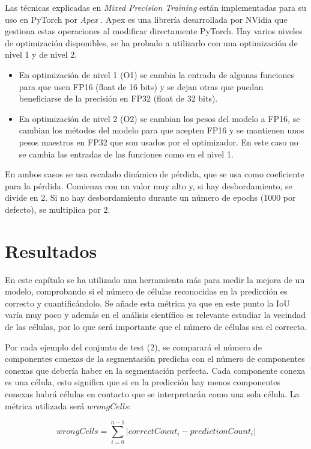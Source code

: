 Las técnicas explicadas en \textit{Mixed Precision Training} están implementadas para su uso en PyTorch por \textit{Apex} \cite{Apex2020}. Apex es una librería desarrollada por NVidia que gestiona estas operaciones al modificar directamente PyTorch. Hay varios niveles de optimización disponibles, se ha probado a utilizarlo con una optimización de nivel 1 y de nivel 2.
\begin{itemize}
\item En optimización de nivel 1 (O1) se cambia la entrada de algunas funciones para que usen FP16 (float de 16 bits) y se dejan otras que puedan beneficiarse de la precisión en FP32 (float de 32 bits).
\item En optimización de nivel 2 (O2) se cambian los pesos del modelo a FP16, se cambian los métodos del modelo para que acepten FP16 y se mantienen unos pesos maestros en FP32 que son usados por el optimizador. En este caso no se cambia las entradas de las funciones como en el nivel 1.
\end{itemize}

En ambos casos se usa escalado dinámico de pérdida, que se usa como coeficiente para la pérdida. Comienza con un valor muy alto y, si hay desbordamiento, se divide en 2. Si no hay desbordamiento durante un número de epochs (1000 por defecto), se multiplica por 2.

\section{Resultados}\label{sec:apex_resultados}

En este capítulo se ha utilizado una herramienta más para medir la mejora de un modelo, comprobando si el número de células reconocidas en la predicción es correcto y cuantificándolo. Se añade esta métrica ya que en este punto la IoU varía muy poco y además en el análisis científico es relevante estudiar la vecindad de las células, por lo que será importante que el número de células sea el correcto.

Por cada ejemplo del conjunto de test (2), se comparará el número de componentes conexas de la segmentación predicha con el número de componentes conexas que debería haber en la segmentación perfecta. Cada componente conexa es una célula, esto significa que si en la predicción hay menos componentes conexas habrá células en contacto que se interpretarán como una sola célula. La métrica utilizada será $wrongCells$:

\begin{equation}
wrongCells = \sum_{i=0}^{n-1} \lvert correctCount_i - predictionCount_i \rvert
\end{equation}


